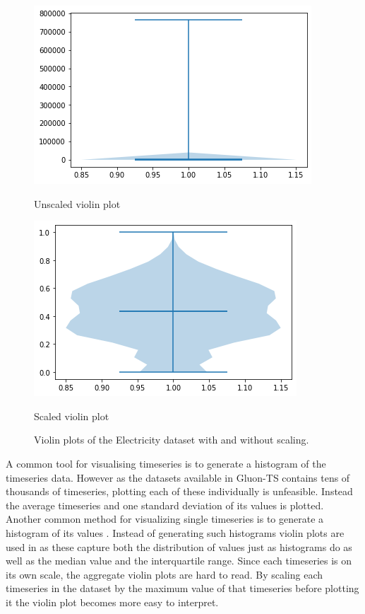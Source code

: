 \begin{figure}[htb]
  \centering
  \includegraphics[width=\linewidth]{./img/electricity_violin_unscaled.png}
  \caption{Unscaled violin plot}

  \label{fig:electricity_violin_unscaled}
  \endminipage\hfill
  \includegraphics[width=\linewidth]{./img/electricity_violin.png}
  \caption{Scaled violin plot}
  \label{fig:electricity_violin_scaled}
  \endminipage\hfill
  \caption{Violin plots of the Electricity dataset with and without scaling.}
\end{figure}

A common tool for visualising timeseries is to generate a histogram of the timeseries data. However as the datasets available in Gluon-TS contains tens of thousands of timeseries, plotting each of these individually is unfeasible. Instead the average timeseries and one standard deviation of its values is plotted. Another common method for visualizing single timeseries is to generate a histogram of its values \cite{hyndman_forecasting_3rd}. Instead of generating such histograms violin plots are used in as these capture both the distribution of values just as histograms do as well as the median value and the interquartile range. Since each timeseries is on its own scale, the aggregate violin plots are hard to read. By scaling each timeseries in the dataset by the maximum value of that timeseries before plotting it the violin plot becomes more easy to interpret.

